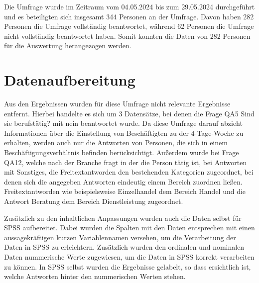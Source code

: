 Die Umfrage wurde im Zeitraum vom 04.05.2024 bis zum 29.05.2024 durchgeführt und es beteiligten sich
insgesamt 344 Personen an der Umfrage. Davon haben 282 Personen die Umfrage vollständig beantwortet,
während 62 Personen die Umfrage nicht vollständig beantwortet haben. Somit konnten die Daten von 282 
Personen für die Auswertung herangezogen werden.

\section{Datenaufbereitung}
Aus den Ergebnissen wurden für diese Umfrage nicht relevante Ergebnisse entfernt. 
Hierbei handelte es sich um 3 Datensätze, bei denen die Frage QA5 \glqq{}Sind sie berufstätig?\grqq{} 
mit \glqq{}nein\grqq{} beantwortet wurde. Da diese Umfrage darauf abzieht Informationen über die 
Einstellung von Beschäftigten zu der 4-Tage-Woche zu erhalten, werden auch nur die 
Antworten von Personen, die sich in einem Beschäftigungsverhältnis befinden berücksichtigt. 
Außerdem wurde bei Frage QA12, welche nach der Branche fragt in der die Person tätig ist,
bei Antworten mit \glqq{}Sonstiges\grqq{}, die Freitextantworden den bestehenden Kategorien zugeordnet,
bei denen sich die angegeben Antworten eindeutig einem Bereich zuordnen ließen. 
Freitextantworden wie beispielsweise \glqq{}Einzelhandel\grqq{} dem Bereich \glqq{}Handel\grqq{} 
und die Antwort \glqq{}Beratung\grqq{} dem Bereich \glqq{}Dienstleistung\grqq{} zugeordnet.

Zusätzlich zu den inhaltlichen Anpassungen wurden auch die Daten selbst für \ac{SPSS} 
\parencite[vgl.][]{ibm_spss_nodate}aufbereitet.
Dabei wurden die Spalten mit den Daten entsprechen mit einen aussagekräftigen kurzen Variablennamen versehen,
um die Verarbeitung der Daten in \ac{SPSS} zu erleichtern. Zusätzlich wurden den ordinalen und nominalen Daten
nummerische Werte zugewiesen, um die Daten in \ac{SPSS} korrekt verarbeiten zu können.
In \ac{SPSS} selbst wurden die Ergebnisse gelabelt, so dass ersichtlich ist, welche Antworten hinter den 
nummerischen Werten stehen.

